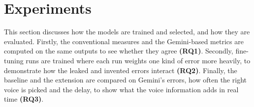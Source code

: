 \section{Experiments}
\label{sec:experiments}
This section discusses how the models are trained and selected, and how they are evaluated. Firstly, the conventional measures and the Gemini-based metrics are computed on the same outputs to see whether they agree \textbf{(RQ1)}. Secondly, fine-tuning runs are trained where each run weights one kind of error more heavily, to demonstrate how the leaked and invented errors interact \textbf{(RQ2)}. Finally, the baseline and the extension are compared on Gemini's errors, how often the right voice is picked and the delay, to show what the voice information adds in real time \textbf{(RQ3)}.



